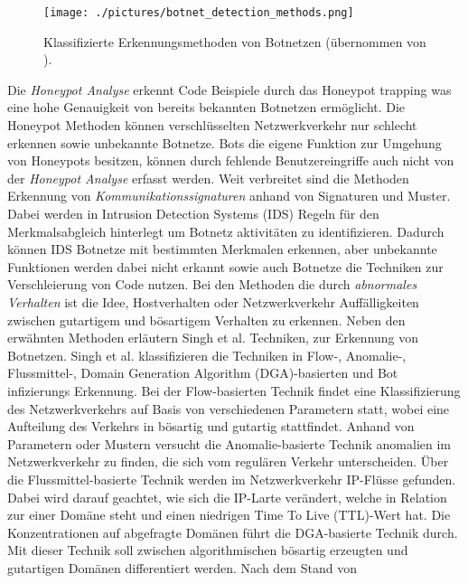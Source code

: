 \begin{figure}[h!]
    \centering
    \texttt{[image: ./pictures/botnet\_detection\_methods.png]}
    \caption{Klassifizierte Erkennungsmethoden von Botnetzen (übernommen von \cite{Xing2021SurveyOB}).}
    \label{fig:bot_det_met}
\end{figure}

Die \textit{Honeypot Analyse} erkennt Code Beispiele durch das Honeypot trapping was eine hohe Genauigkeit von bereits bekannten Botnetzen ermöglicht. Die Honeypot Methoden können
verschlüsselten Netzwerkverkehr nur schlecht erkennen sowie unbekannte Botnetze. Bots die eigene Funktion zur Umgehung von Honeypots besitzen, können durch fehlende Benutzereingriffe
auch nicht von der \textit{Honeypot Analyse} erfasst werden. Weit verbreitet sind die Methoden Erkennung von \textit{Kommunikationssignaturen} anhand von Signaturen und Muster. Dabei 
werden in Intrusion Detection Systems (IDS) Regeln für den Merkmalsabgleich hinterlegt um Botnetz aktivitäten zu identifizieren. Dadurch können IDS Botnetze mit bestimmten Merkmalen 
erkennen, aber unbekannte Funktionen werden dabei nicht erkannt sowie auch Botnetze die Techniken zur Verschleierung von Code nutzen. Bei den Methoden die durch 
\textit{abnormales Verhalten} ist die Idee, Hostverhalten oder Netzwerkverkehr Auffälligkeiten zwischen gutartigem und bösartigem Verhalten zu erkennen. Neben den erwähnten Methoden 
erläutern Singh et al. \cite{DBLP:journals/compsec/SinghSK19} Techniken, zur Erkennung von Botnetzen. Singh et al. klassifizieren die Techniken in Flow-, Anomalie-, Flussmittel-, Domain Generation 
Algorithm (DGA)-basierten \cite{DBLP:journals/jksucis/ManasrahKF22} und Bot infizierungs Erkennung. Bei der Flow-basierten Technik findet eine Klassifizierung des Netzwerkverkehrs auf 
Basis von verschiedenen Parametern statt, wobei eine Aufteilung des Verkehrs in bösartig und gutartig stattfindet. Anhand von Parametern oder Mustern versucht die Anomalie-basierte Technik 
anomalien im Netzwerkverkehr zu finden, die sich vom regulären Verkehr unterscheiden. Über die Flussmittel-basierte Technik werden im Netzwerkverkehr IP-Flüsse gefunden. Dabei wird darauf 
geachtet, wie sich die IP-Larte verändert, welche in Relation zur einer Domäne steht und einen niedrigen Time To Live (TTL)-Wert hat. Die Konzentrationen auf abgefragte Domänen führt die 
DGA-basierte Technik durch. Mit dieser Technik soll zwischen algorithmischen bösartig erzeugten und gutartigen Domänen differentiert werden. Nach dem Stand von \cite{DBLP:journals/compsec/SinghSK19} 
